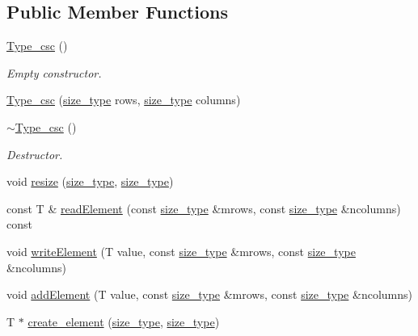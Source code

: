 \subsection*{Public Member Functions}
\begin{DoxyCompactItemize}
\item 
\hyperlink{classlmx_1_1Type__csc_a2915f99c2fab8cca3dd8509d1f5fbb82}{Type\-\_\-csc} ()
\begin{DoxyCompactList}\small\item\em Empty constructor. \end{DoxyCompactList}\item 
\hyperlink{classlmx_1_1Type__csc_a2fe109779f2ba66d3c22abc8483ea7d6}{Type\-\_\-csc} (\hyperlink{lmx__mat__data_8h_a49b489a408a211a90e766329c0732d7b}{size\-\_\-type} rows, \hyperlink{lmx__mat__data_8h_a49b489a408a211a90e766329c0732d7b}{size\-\_\-type} columns)
\item 
\hyperlink{classlmx_1_1Type__csc_a425e938c038cda4f62fe818e41d175d5}{$\sim$\-Type\-\_\-csc} ()
\begin{DoxyCompactList}\small\item\em Destructor. \end{DoxyCompactList}\item 
void \hyperlink{classlmx_1_1Type__csc_acb0b1a88c3e46d0951c0e03099e33cc2}{resize} (\hyperlink{lmx__mat__data_8h_a49b489a408a211a90e766329c0732d7b}{size\-\_\-type}, \hyperlink{lmx__mat__data_8h_a49b489a408a211a90e766329c0732d7b}{size\-\_\-type})
\item 
const T \& \hyperlink{classlmx_1_1Type__csc_aaa74136864d441799168b4568f697d53}{read\-Element} (const \hyperlink{lmx__mat__data_8h_a49b489a408a211a90e766329c0732d7b}{size\-\_\-type} \&mrows, const \hyperlink{lmx__mat__data_8h_a49b489a408a211a90e766329c0732d7b}{size\-\_\-type} \&ncolumns) const 
\item 
void \hyperlink{classlmx_1_1Type__csc_a814cd964f39fa41feffbf0795d3e446d}{write\-Element} (T value, const \hyperlink{lmx__mat__data_8h_a49b489a408a211a90e766329c0732d7b}{size\-\_\-type} \&mrows, const \hyperlink{lmx__mat__data_8h_a49b489a408a211a90e766329c0732d7b}{size\-\_\-type} \&ncolumns)
\item 
void \hyperlink{classlmx_1_1Type__csc_aec6ca35c9a16d33a6ec7e4754f0cfe0b}{add\-Element} (T value, const \hyperlink{lmx__mat__data_8h_a49b489a408a211a90e766329c0732d7b}{size\-\_\-type} \&mrows, const \hyperlink{lmx__mat__data_8h_a49b489a408a211a90e766329c0732d7b}{size\-\_\-type} \&ncolumns)
\item 
T $\ast$ \hyperlink{classlmx_1_1Type__csc_ac69045358a8d2b699ce32333f43f58e0}{create\-\_\-element} (\hyperlink{lmx__mat__data_8h_a49b489a408a211a90e766329c0732d7b}{size\-\_\-type}, \hyperlink{lmx__mat__data_8h_a49b489a408a211a90e766329c0732d7b}{size\-\_\-type})

\end{DoxyCompactItemize}

